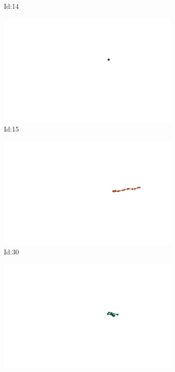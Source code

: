 \documentclass[12pt,twoside]{report}
\begin{document}
\begin{figure}
\begin{subfigure}[b]{0.20\textwidth}
\caption{Id:14}
\end{subfigure}
\begin{subfigure}[b]{0.20\textwidth}
\centering
\includegraphics[width=\textwidth]{../trajectories/15.png}
\caption{Id:15}
\end{subfigure}
\begin{subfigure}[b]{0.20\textwidth}
\centering
\includegraphics[width=\textwidth]{../trajectories/30.png}
\caption{Id:30}
\end{subfigure}
\begin{subfigure}[b]{0.20\textwidth}
\centering
\includegraphics[width=\textwidth]{../trajectories/108.png}

\end{subfigure}
\end{figure}
\end{document}
